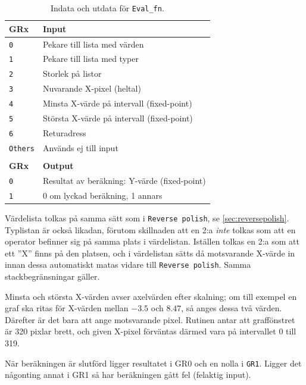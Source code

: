 \documentclass[]{article}
\begin{document}
\begin{table}[H]
\centering
\begin{tabular}{ll}
	\textbf{GRx}    & \textbf{Input}               \\ \hline
	\texttt{0}      & Pekare till lista med värden \\
	\texttt{1}      & Pekare till lista med typer  \\
	\texttt{2}      & Storlek på listor            \\
	\texttt{3}      & Nuvarande X-pixel (heltal)   \\
	\texttt{4}      & Minsta X-värde på intervall (fixed-point) \\
	\texttt{5}      & Största X-värde på intervall (fixed-point) \\
        \texttt{6}      & Returadress                  \\
        \texttt{Others} & Används ej till input        \\
                        &                              \\
	\textbf{GRx}    & \textbf{Output}              \\ \hline
	\texttt{0}      & Resultat av beräkning: Y-värde (fixed-point) \\
	\texttt{1}      & 0 om lyckad beräkning, 1 annars
\end{tabular}
\caption{Indata och utdata för \texttt{Eval\_fn}.}
\end{table}

\noindent
Värdelista tolkas på samma sätt som i \texttt{Reverse polish}, se \ref{sec:reversepolish}. Typlistan är också likadan, förutom skillnaden att en 2:a \textit{inte} tolkas som att en operator befinner sig på samma plats i värdelistan. Iställen tolkas en 2:a som att ett ''X'' finns på den platsen, och i värdelistan sätts då motsvarande X-värde in innan dessa automatiskt matas vidare till \texttt{Reverse polish}. Samma stackbegränsningar gäller.

Minsta och största X-värden avser axelvärden efter skalning; om till exempel en graf ska ritas för X-värden mellan $-3.5$ och $8.47$, så anges dessa två värden. Därefter är det bara att ange motsvarande pixel. Rutinen antar att graffönstret är 320 pixlar brett, och given X-pixel förväntas därmed vara på intervallet 0 till 319.

När beräkningen är slutförd ligger resultatet i GR0 och en nolla i \texttt{GR1}. Ligger det någonting annat i GR1 så har beräkningen gått fel (felaktig input).
\end{document}
